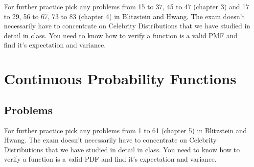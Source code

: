 \documentclass[12pt]{extbook}
\begin{document}
For further practice pick any problems from 15 to 37, 45 to 47 (chapter 3) and 17 to 29, 56 to 67, 73 to 83 (chapter 4) in Blitzstein and Hwang.   The exam doesn't necessarily have to concentrate on Celebrity Distributions that we have studied in detail in class.   You need to know how to verify a function is a valid PMF and find it's expectation and variance.


\chapter{Continuous Probability Functions}


\section{Problems}

\begin{enumerate}

















\end{enumerate}

For further practice pick any problems from 1 to 61 (chapter 5) in Blitzstein and Hwang.   The exam doesn't necessarily have to concentrate on Celebrity Distributions that we have studied in detail in class.   You need to know how to verify a function is a valid PDF and find it's expectation and variance.
\end{document}
